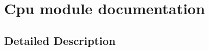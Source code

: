 \hypertarget{group___cpu__module}{}\section{Cpu module documentation}
\label{group___cpu__module}


\subsection{Detailed Description}
